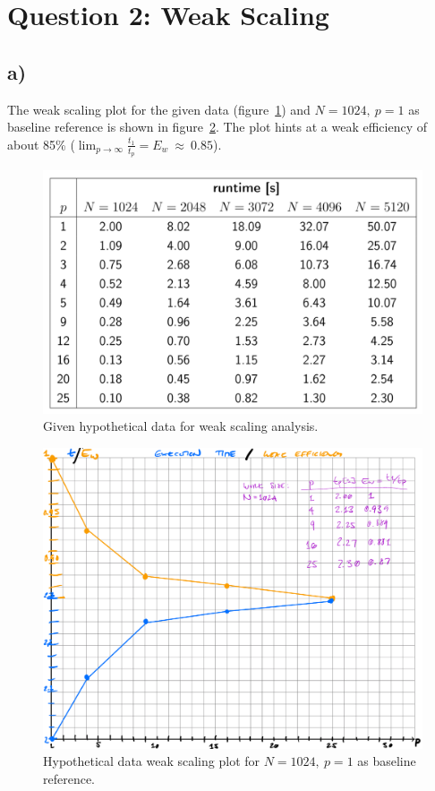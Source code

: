 \documentclass[11pt,a4paper]{article}
\begin{document}
\section{Question 2: Weak Scaling}

\subsection{a)}

The weak scaling plot for the given data (figure~\ref{fig:2}) and $N=1024,\ p=1$ as baseline reference is shown in figure~\ref{fig:3}.
The plot hints at a weak efficiency of about 85\% ($\lim_{p \rightarrow \infty}\frac{t_1}{t_p} = E_w\ \approx\ 0.85$).



\begin{figure}[ht!]
    \begin{center}
    \includegraphics[scale=0.5]{fig2.pdf} 
    \end{center}
    \caption{Given hypothetical data for weak scaling analysis.} 
    \label{fig:2}
\end{figure}

\begin{figure}[hb!]
    \begin{center}
    \includegraphics[scale=0.7]{fig3.pdf} 
    \end{center}
    \caption{Hypothetical data weak scaling plot for $N=1024,\ p=1$ as baseline reference.} 
    \label{fig:3}
\end{figure}
\end{document}
